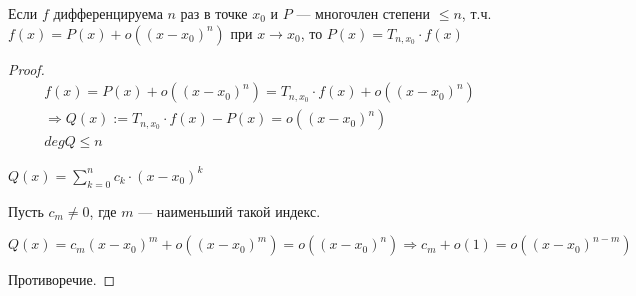 \begin{follow}
    Если $f$ дифференцируема $n$ раз в точке $x_0$ и $P$ --- многочлен степени $\leqslant n$, т.ч.
    $f(x) = P(x) + o((x - x_0)^n)$ при $x \rightarrow x_0$, то $P(x) = T_{n,x_0} \cdot f(x)$

    \begin{proof}
        
        \begin{gather*}
            f(x) = P(x) + o((x - x_0)^n) = T_{n,x_0} \cdot f(x) + o((x - x_0)^n)  \\
            \Longrightarrow Q(x) := T_{n, x_0} \cdot f(x) - P(x) = o((x - x_0)^n) \\
            deg Q \leqslant n
        \end{gather*}

        $Q(x) = \sum_{k = 0}^{n} c_k \cdot (x - x_0)^k $
        
        Пусть $c_m \neq 0$, где $m$ --- наименьший такой индекс.

        $Q(x) = c_m(x - x_0)^m + o((x - x_0)^m) = o((x - x_0)^n) \Longrightarrow c_m + o(1) = o((x - x_0)^{n - m})$

        Противоречие.

    \end{proof}
\end{follow}